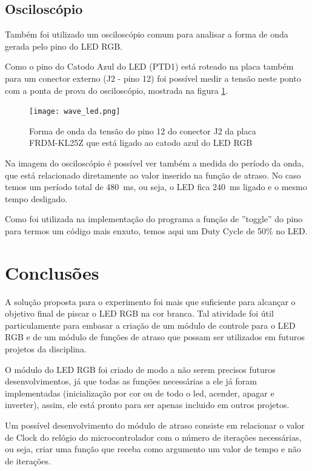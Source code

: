 \documentclass{article}
\begin{document}
\subsection{Osciloscópio}

Também foi utilizado um osciloscópio comum para analisar a forma de onda gerada pelo pino do LED RGB.

Como o pino do Catodo Azul do LED (PTD1) está roteado na placa também para um conector externo (J2 - pino 12) foi possível medir a tensão neste ponto com a ponta de prova do osciloscópio, mostrada na figura \ref{wave_led}.

\begin{figure}[ht!]
  \centering
  \texttt{[image: wave\_led.png]}
  \caption{Forma de onda da tensão do pino 12 do conector J2 da placa FRDM-KL25Z que está ligado ao catodo azul do LED RGB \label{wave_led}}
\end{figure}

Na imagem do osciloscópio é possível ver também a medida do período da onda, que está relacionado diretamente ao valor inserido na função de atraso. No caso temos um período total de \SI{480}{\milli\second}, ou seja, o LED fica \SI{240}{\milli\second} ligado e o mesmo tempo desligado.

Como foi utilizada na implementação do programa a função de ''toggle'' do pino para termos um código mais enxuto, temos aqui um Duty Cycle de 50\% no LED.

\clearpage
\section{Conclusões}

A solução proposta para o experimento foi mais que suficiente para alcançar o objetivo final de piscar o LED RGB na cor branca. Tal atividade foi útil particulamente para embasar a criação de um módulo de controle para o LED RGB e de um módulo de funções de atraso que possam ser utilizados em futuros projetos da disciplina.

O módulo do LED RGB foi criado de modo a não serem precisos futuros desenvolvimentos, já que todas as funções necessárias a ele já foram implementadas (inicialização por cor ou de todo o led, acender, apagar e inverter), assim, ele está pronto para ser apenas incluido em outros projetos.

Um possível desenvolvimento do módulo de atraso consiste em relacionar o valor de Clock do relógio do microcontrolador com o número de iterações necessárias, ou seja, criar uma função que receba como argumento um valor de tempo e não de iterações.
\end{document}

